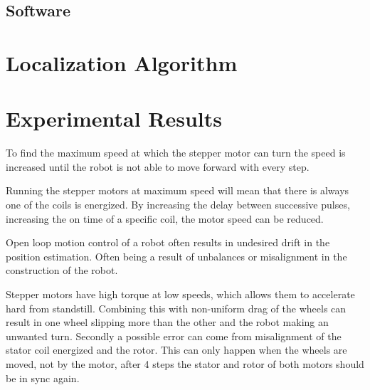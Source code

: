 \documentclass[letterpaper, 10 pt, conference]{ieeeconf}  %
\begin{document}
\subsection{Software}




\section{Localization Algorithm}






\section{Experimental Results}


To find the maximum speed at which the stepper motor can turn the speed is increased until the robot is not able to move forward with every step.

Running the stepper motors at maximum speed will mean that there is always one of the coils is energized.
By increasing the delay between successive pulses, increasing the on time of a specific coil, the motor speed can be reduced. 

Open loop motion control of a robot often results in undesired drift in the position estimation.
Often being a result of unbalances or misalignment in the construction of the robot.

Stepper motors have high torque at low speeds, which allows them to accelerate hard from standstill.
Combining this with non-uniform drag of the wheels can result in one wheel slipping more than the other and the robot making an unwanted turn. 
Secondly a possible error can come from misalignment of the stator coil energized and the rotor.
This can only happen when the wheels are moved, not by the motor, after 4 steps the stator and rotor of both motors should be in sync again.
\end{document}
